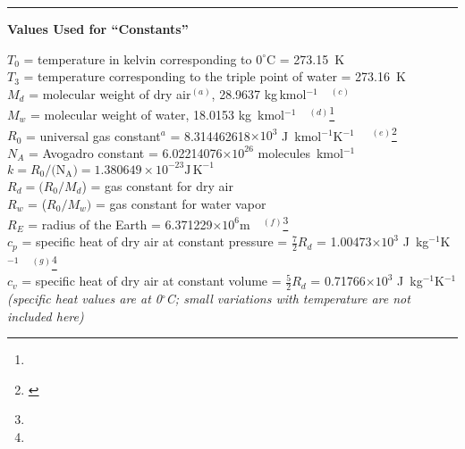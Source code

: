 \documentclass[
  english,
]{book}
\begin{document}
\begin{center}\rule{0.5\linewidth}{0.5pt}\end{center}

\textbf{\protect\hypertarget{constants-table}{}{Values Used for
``Constants''}}

\(T_{0}\) = temperature in kelvin corresponding to \(0^{\circ}\)C =
273.15~K\\
\(T_{3}\) = temperature corresponding to the triple point of
water = 273.16~K\\
\(M_{d}\) = molecular weight of dry
air\(^{(a)}\), 28.9637
kg\(\,\)kmol\(^{-1}\)~~\(^{(c)}\)\\
\(M_{w}\) = molecular weight of water,
18.0153 kg~kmol\(^{-1}\)~~\(^{(d)}\)\footnote{}\\
\(R_{0}\) = universal gas
constant\(^{a}\)
= 8.314462618\(\times 10^{3}\) J~kmol\(^{-1}\)K\(^{-1}\)~~
\(^{(e)}\)\footnote{\label{fn:2006-CODATA}}\\
\(N_{A}\) = Avogadro constant = 6.02214076\(\times 10^{26}\)
molecules~kmol\(^{-1}\)\\
\(k=R_{0}/(\mathrm{N_{A})}=1.380649\times10^{-23}\mathrm{J}\,\mathrm{K}^{-1}\)\\
\(R_{d}=(R_{0}/M_{d}\)) = gas constant for dry
air\\
\(R_{w}\) = (\(R_{0}/M_{w})\) = gas constant for water
vapor\\
\(R_{E}\) = radius of the Earth =
6.371229\(\times 10^{6}\)m~~\(^{(f)}\)\footnote{}\\
\(c_{p}\) = specific heat of dry air at constant
pressure =
\(\frac{7}{2}R_{d}\) = 1.00473\(\times10^{3}\)
J~kg\(^{-1}\)K\(^{-1}\)~~\(^{(g)}\)\footnote{}\\
\(c_{v}\) = specific heat of dry air at constant
volume =
\(\frac{5}{2}R_{d}\) = 0.71766\(\times 10^{3}\)
J~kg\(^{-1}\)K\(^{-1}\)\\
\hspace*{0.333em}\hspace*{0.333em}\hspace*{0.333em}\hspace*{0.333em}\hspace*{0.333em}\emph{(specific
heat values are at 0\(^{\circ}\)C; small variations with temperature are
not included here)}\\
\end{document}
